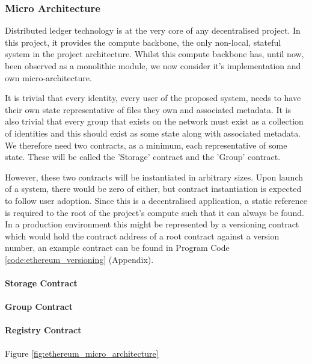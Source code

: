 \subsubsection{Micro Architecture}

Distributed ledger technology is at the very core of any decentralised project. In this project, it provides the compute backbone, the only non-local, stateful system in the project architecture. Whilst this compute backbone has, until now, been observed as a monolithic module, we now consider it's implementation and own micro-architecture.

It is trivial that every identity, every user of the proposed system, needs to have their own state representative of files they own and associated metadata. It is also trivial that every group that exists on the network must exist as a collection of identities and this should exist as some state along with associated metadata. We therefore need two contracts, as a minimum, each representative of some state. These will be called the 'Storage' contract and the 'Group' contract.

However, these two contracts will be instantiated in arbitrary sizes. Upon launch of a system, there would be zero of either, but contract instantiation is expected to follow user adoption. Since this is a decentralised application, a static reference is required to the root of the project's compute such that it can always be found. In a production environment this might be represented by a versioning contract which would hold the contract address of a root contract against a version number, an example contract can be found in Program Code \ref{code:ethereum_versioning} (Appendix).

\paragraph{Storage Contract}

\paragraph{Group Contract}

\paragraph{Registry Contract}




Figure \ref{fig:ethereum_micro_architecture}
